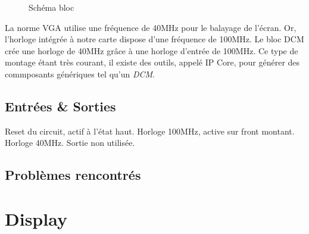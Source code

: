 \documentclass[french]{nakrule}
\begin{document}
\begin{figure}
\caption{Schéma bloc}
\label{dcmBloc}
\end{figure}

La norme VGA utilise une fréquence de 40MHz pour le balayage de l’écran. Or,
l’horloge intégrée à notre carte dispose d’une fréquence de 100MHz. Le bloc DCM
crée une horloge de 40MHz grâce à une horloge d'entrée de 100MHz.
Ce type de montage étant très courant, il existe des outils, appelé IP Core,
pour générer des commposants génériques tel qu'un \emph{DCM}. 
\vspace{.4in}

\subsection{Entrées \& Sorties}
\label{subsec:Entrées_Sorties_dmc}

\begin{descr}
   Reset du circuit, actif à l'état haut.
   Horloge 100MHz, active sur front montant.
   Horloge 40MHz.
   Sortie non utilisée.
\end{descr}


\subsection{Problèmes rencontrés}
\label{subsec:Problèmes_rencontrés_alienRocket}

\clearpage

\section{Display}
\label{sec:display}
\end{document}
